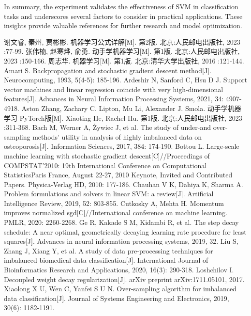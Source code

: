 \documentclass[a4paper, utf8]{ctexart}
\begin{document}
	In summary, the experiment validates the effectiveness of SVM in classification tasks and underscores several factors to consider in practical applications. These insights provide valuable references for further research and model optimization.
	
	\let\cleardoublepage\clearpage
	
	\begin{thebibliography}{99}  
		 谢文睿, 秦州, 贾彬彬. 机器学习公式详解[M]. 第2版. 北京:人民邮电出版社, 2023 :77-99.
		 张伟楠, 赵寒烨, 俞勇. 动手学机器学习[M]. 第1版. 北京:人民邮电出版社, 2023 :150-166.
		 周志华. 机器学习[M]. 第1版. 北京:清华大学出版社, 2016 :121-144.
		 Amari S. Backpropagation and stochastic gradient descent method[J]. Neurocomputing, 1993, 5(4-5): 185-196.
		 Ardeshir N, Sanford C, Hsu D J. Support vector machines and linear regression coincide with very high-dimensional features[J]. Advances in Neural Information Processing Systems, 2021, 34: 4907-4918.
		 Aston Zhang, Zachary C. Lipton, Mu Li, Alexander J. Smola. 动手学机器学习 PyTorch版[M]. Xiaoting He, Rachel Hu. 第1版. 北京:人民邮电出版社, 2023 :311-368.
		 Bach M, Werner A, Żywiec J, et al. The study of under-and over-sampling methods' utility in analysis of highly imbalanced data on osteoporosis[J]. Information Sciences, 2017, 384: 174-190.
		 Bottou L. Large-scale machine learning with stochastic gradient descent[C]//Proceedings of COMPSTAT'2010: 19th International Conference on Computational StatisticsParis France, August 22-27, 2010 Keynote, Invited and Contributed Papers. Physica-Verlag HD, 2010: 177-186.
		 Chauhan V K, Dahiya K, Sharma A. Problem formulations and solvers in linear SVM: a review[J]. Artificial Intelligence Review, 2019, 52: 803-855.
		 Cutkosky A, Mehta H. Momentum improves normalized sgd[C]//International conference on machine learning. PMLR, 2020: 2260-2268.
		 Ge R, Kakade S M, Kidambi R, et al. The step decay schedule: A near optimal, geometrically decaying learning rate procedure for least squares[J]. Advances in neural information processing systems, 2019, 32.
		 Liu S, Zhang J, Xiang Y, et al. A study of data pre-processing techniques for imbalanced biomedical data classification[J]. International Journal of Bioinformatics Research and Applications, 2020, 16(3): 290-318.
		 Loshchilov I. Decoupled weight decay regularization[J]. arXiv preprint arXiv:1711.05101, 2017.
		 Xiaolong X U, Wen C, Yanfei S U N. Over-sampling algorithm for imbalanced data classification[J]. Journal of Systems Engineering and Electronics, 2019, 30(6): 1182-1191.
	\end{thebibliography}
	
\end{document}
